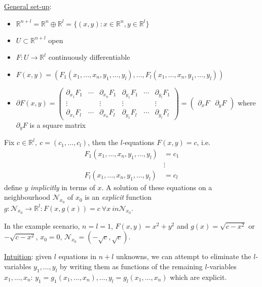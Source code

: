 \documentclass[a4paper]{article}
\theoremstyle{definition}
\begin{document}
\underline{General set-up}:
\begin{itemize}
    \item $\mathbb R^{n+l} = \mathbb R^n \oplus \mathbb R^l = \{(x,y):x\in \mathbb R^n, y\in \mathbb R^l\}$
    \item $U\subset \mathbb R^{n+l}$ open
    \item $F:U\rightarrow \mathbb R^l$ continuously differentiable
    \item $F(x,y) = \left(F_1(x_1,\ldots,x_n,y_1,\ldots,y_l),\ldots,F_l(x_1,\ldots,x_n,y_1,\ldots,y_l) \right)$
    \item $\partial F(x,y) = \begin{pmatrix}
        \partial_{x_1} F_1 & \cdots & \partial_{x_n} F_1 & \partial_{y_1} F_1 & \cdots & \partial_{y_l} F_1 \\
        \vdots & & \vdots & \vdots & & \vdots \\
        \partial_{x_1} F_l & \cdots & \partial_{x_n} F_l & \partial_{y_1} F_l & \cdots & \partial_{y_l} F_l
    \end{pmatrix} = \begin{pmatrix}
        \partial_x F & \partial_y F
    \end{pmatrix}$ where $\partial_y F$ is a square matrix
\end{itemize}

Fix $c\in \mathbb R^l,\ c=(c_1,\ldots,c_l)$, then the $l$-equations $F(x,y)=c$, i.e.
\[
\begin{aligned}
F_1(x_1,\ldots,x_n,y_1,\ldots,y_l)&=c_1 \\
&\vdots \\
F_l(x_1,\ldots,x_n,y_1,\ldots,y_l)&=c_l
\end{aligned}
\]
define $y$ \textit{implicitly} in terms of $x$. A solution of these equations on a neighbourhood $\mathcal N_{x_0}$ of $x_0$ is an \textit{explicit} function $g:\mathcal N_{x_0}\rightarrow \mathbb R^l : F(x,g(x)) = c \ \forall x\ in \mathcal N_{x_0}$.

In the example scenario, $n=l=1$, $F(x,y) = x^2+y^2$ and $g(x) = \sqrt{c-x^2}$ or $-\sqrt{c-x^2}$, $x_0=0$, $\mathcal N_{x_0} = \left(-\sqrt{c},\sqrt{c}\right)$.

\underline{Intuition}: given $l$ equations in $n+l$ unknowns, we can attempt to eliminate the $l$-variables $y_1,\ldots,y_l$ by writing them as functions of the remaining $l$-variables $x_1,\ldots,x_n$: $y_1=g_1(x_1,\ldots,x_n),\ldots,y_l=g_l(x_1,\ldots,x_n)$ which are explicit.
\end{document}
